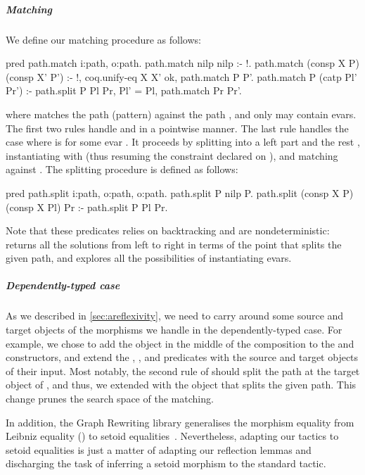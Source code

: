 \documentclass[a4paper,UKenglish,cleveref,autoref]{lipics-v2021}
\begin{document}
\subparagraph{Matching}
We define our matching procedure as follows:
\begin{elpicode}
pred path.match i:path, o:path.
path.match nilp nilp :- !.
path.match (consp X P) (consp X' P') :- !, coq.unify-eq X X' ok, path.match P P'.
path.match P (catp Pl' Pr') :- path.split P Pl Pr, Pl' = Pl, path.match Pr Pr'.
\end{elpicode}
where  matches the path (pattern)  against the path , and only
 may contain evars.
The first two rules handle  and  in a pointwise manner.
The last rule handles the case where  is  for some evar .
It proceeds by splitting  into a left part  and the rest , instantiating
 with  (thus resuming the constraint declared on ), and matching
 against .
The splitting procedure  is defined as follows:
\begin{elpicode}
pred path.split i:path, o:path, o:path.
path.split P nilp P.
path.split (consp X P) (consp X Pl) Pr :- path.split P Pl Pr.
\end{elpicode}
Note that these predicates relies on backtracking and are nondeterministic:
 returns all the solutions from left to right in terms of the point that splits the
given path, and  explores all the possibilities of instantiating evars.

\subparagraph{Dependently-typed case}
As we described in \cref{sec:areflexivity}, we need to carry around some source and target objects
of the morphisms we handle in the dependently-typed case.
For example, we chose to add the object in the middle of the composition to the  and
 constructors, and extend the , , and 
predicates with the source and target objects of their input.
Most notably, the second rule of  should split the path  at the target
object of , and thus, we extended  with the object that splits the given
path. This change prunes the search space of the matching.

In addition, the Graph Rewriting library generalises the morphism equality from Leibniz equality
() to setoid equalities~\cite[Section 2.1]{DBLP:conf/cpp/ArsacHP26}. Nevertheless, adapting
our tactics to setoid equalities is just a matter of adapting our reflection lemmas and discharging
the task of inferring a setoid morphism to the standard  tactic.
\end{document}
